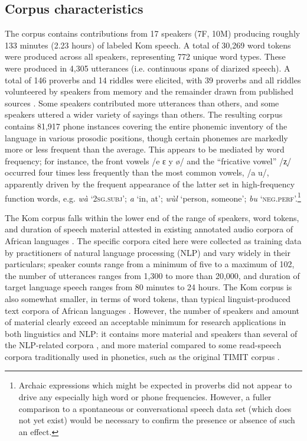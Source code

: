 \documentclass[output=paper,colorlinks,citecolor=brown
]{langscibook}
\begin{document}
\subsection{Corpus characteristics}
\largerpage
The corpus contains contributions from 17 speakers (7F, 10M) producing roughly 133 minutes (2.23 hours) of labeled Kom speech. 
A total of 30,269 word tokens were produced across all speakers, representing 772 unique word types. 
These were produced in 4,305 utterances (i.e. continuous spans of diarized speech). 
A total of 146 proverbs and 14 riddles were elicited, with 39 proverbs and all riddles volunteered by speakers from memory and the remainder drawn from published sources \citep{loh-timlini-i,loah-wisdom}. Some speakers contributed more utterances than others, and some speakers uttered a wider variety of sayings than others. 
The resulting corpus contains 81,917 phone instances covering the entire phonemic inventory of the language in various prosodic positions, though certain phonemes are markedly more or less frequent than the average.
This appears to be mediated by word frequency; for instance, the front vowels /e ɛ y \o{}/ and the ``fricative vowel'' /z̩/ occurred four times less frequently than the most common vowels, /a u/, apparently driven by the frequent appearance of the latter set in high-frequency function words, e.g. \textit{w\`a} `\textsc{2sg.subj}'; \textit{a} `in, at'; \textit{w\`ul} `person, someone'; \textit{bu} `\textsc{neg.perf}'.\footnote{Archaic expressions which might be expected in proverbs did not appear to drive any especially high word or phone frequencies. However, a fuller comparison to a spontaneous or conversational speech data set (which does not yet exist) would be necessary to confirm the presence or absence of such an effect.}

The Kom corpus falls within the lower end of the range of speakers, word tokens, and duration of speech material attested in existing annotated audio corpora of African languages \citep[e.g.][]{van-niekerk-etal-2017, bamba2021, gauthier-etal-2016-collecting, Schlippe2012HausaLV, Nimaan2014BuildingAE, gutkin2020developing}. 
The specific corpora cited here were collected as training data by practitioners of natural language processing (NLP) and vary widely in their particulars; 
speaker counts range from a minimum of five to a maximum of 102,  the number of utterances ranges from 1,300 to more than 20,000, and duration of target language speech ranges from 80 minutes to 24 hours.  
The Kom corpus is also somewhat smaller, in terms of word tokens, than typical linguist-produced text corpora of African languages \citep[e.g.][]{prinsloo, deschryver}. 
 However, the number of speakers and amount of material clearly exceed an acceptable minimum for research applications in both linguistics and NLP: it contains more material and speakers than several of the NLP-related corpora \citep{van-niekerk-etal-2017}, and more material compared to some read-speech corpora traditionally used in phonetics, such as the original TIMIT corpus \citep{zue1990speech, garofolo1993darpa}.
\end{document}
